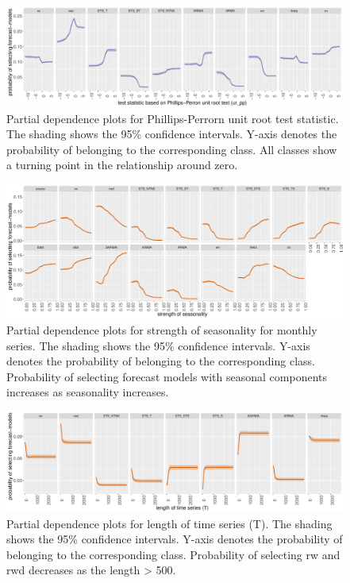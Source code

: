\documentclass[11pt,a4paper,]{article}
\begin{document}
\begin{figure}[h]

{\centering \includegraphics[width=\textwidth]{figure/pdpyearlyurpp-1} 

}

\caption{Partial dependence plots for Phillips-Perrorn unit root test statistic. The shading shows the 95\% confidence intervals. Y-axis denotes the probability of belonging to the corresponding class. All classes show a turning point in the relationship around zero.}\label{fig:pdpyearlyurpp}
\end{figure}

\begin{figure}[h]

{\centering \includegraphics[width=\textwidth]{figure/pdpmonthlyseasonality-1} 

}

\caption{Partial dependence plots for strength of seasonality for monthly series. The shading shows the 95\% confidence intervals. Y-axis denotes the probability of belonging to the corresponding class. Probability of selecting forecast models with seasonal components increases as seasonality increases.}\label{fig:pdpmonthlyseasonality}
\end{figure}

\begin{figure}[h]

{\centering \includegraphics[width=\textwidth]{figure/pdpmonthlyT-1} 

}

\caption{Partial dependence plots for length of time series (T). The shading shows the 95\% confidence intervals. Y-axis denotes the probability of belonging to the corresponding class. Probability of selecting rw and rwd decreases as the length > 500.}\label{fig:pdpmonthlyT}
\end{figure}
\end{document}
